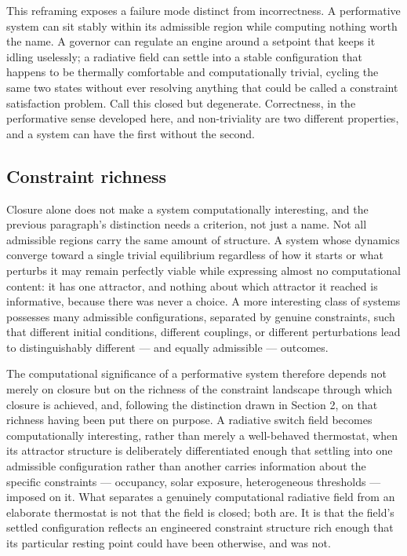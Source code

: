 \documentclass[11pt]{article}
\begin{document}
This reframing exposes a failure mode distinct from incorrectness. A performative system can sit stably within its admissible region while computing nothing worth the name. A governor can regulate an engine around a setpoint that keeps it idling uselessly; a radiative field can settle into a stable configuration that happens to be thermally comfortable and computationally trivial, cycling the same two states without ever resolving anything that could be called a constraint satisfaction problem. Call this closed but degenerate. Correctness, in the performative sense developed here, and non-triviality are two different properties, and a system can have the first without the second.

\subsection{Constraint richness}

Closure alone does not make a system computationally interesting, and the previous paragraph's distinction needs a criterion, not just a name. Not all admissible regions carry the same amount of structure. A system whose dynamics converge toward a single trivial equilibrium regardless of how it starts or what perturbs it may remain perfectly viable while expressing almost no computational content: it has one attractor, and nothing about which attractor it reached is informative, because there was never a choice. A more interesting class of systems possesses many admissible configurations, separated by genuine constraints, such that different initial conditions, different couplings, or different perturbations lead to distinguishably different --- and equally admissible --- outcomes.

The computational significance of a performative system therefore depends not merely on closure but on the richness of the constraint landscape through which closure is achieved, and, following the distinction drawn in Section 2, on that richness having been put there on purpose. A radiative switch field becomes computationally interesting, rather than merely a well-behaved thermostat, when its attractor structure is deliberately differentiated enough that settling into one admissible configuration rather than another carries information about the specific constraints --- occupancy, solar exposure, heterogeneous thresholds --- imposed on it. What separates a genuinely computational radiative field from an elaborate thermostat is not that the field is closed; both are. It is that the field's settled configuration reflects an engineered constraint structure rich enough that its particular resting point could have been otherwise, and was not.
\end{document}

